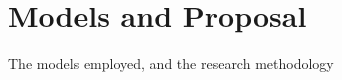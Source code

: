 
\chapter[Models and Proposal]{Models and Proposal}\label{chap:proposal}
The models employed, and the research methodology